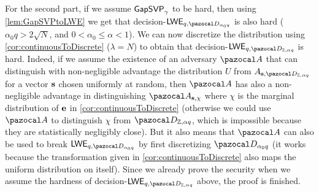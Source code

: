 {\begin{proofE}
    For the second part, if we assume $\textsf{GapSVP}_\gamma$ to be hard, then using \cref{lem:GapSVPtoLWE} we get that decision-$\LWE_{q, \cD_{\alpha_0 q}}$ is also hard ($\alpha_0 q > 2\sqrt{N}$, and $0 < \alpha_0 \leq \alpha < 1$). We can now discretize the distribution using \cref{cor:continuousToDiscrete} ($\lambda = N$) to obtain that decision-$\LWE_{q, \cD_{\Z, \alpha q}}$ is hard. Indeed, if we assume the existence of an adversary $\cA$ that can distinguish with non-negligible advantage the distribution $U$ from $A_{\vect{s},\cD_{\Z, \alpha q}}$ for a vector $\mathbf{s}$ chosen uniformly at random, then $\cA$ has also a non-negligible advantage in distinguishing $\cA_{\vect{s},\chi}$ where $\chi$ is the marginal distribution of $\mathbf{e}$ in \cref{cor:continuousToDiscrete} (otherwise we could use $\cA$ to distinguish $\chi$ from $\cD_{\Z, \alpha q}$, which is impossible because they are statistically negligibly close). But it also means that $\cA$ can also be used to break $\LWE_{q,\cD_{\alpha_0 q}}$ by first discretizing $\cD_{\alpha_0 q}$ (it works because the transformation given in \cref{cor:continuousToDiscrete} also maps the uniform distribution on itself). Since we already prove the security when we assume the hardness of decision-$\LWE_{q, \cD_{\Z, \alpha q}}$ above, the proof is finished.
  \end{proofE}
}


